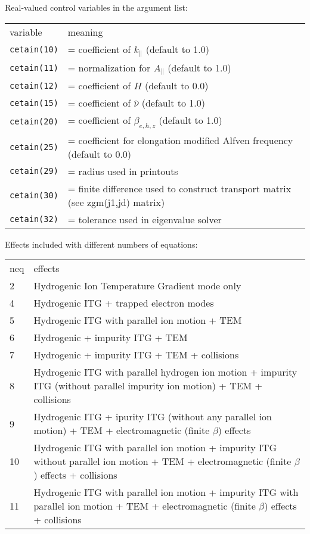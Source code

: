 \renewcommand{\arraystretch}{1.0}
\begin{center}
Real-valued control variables in the argument list:
\begin{tabular}{lp{4.0in}}
variable & meaning \\
{\tt cetain(10)} & = coefficient of $ k_\parallel $ (default to 1.0) \\
{\tt cetain(11)} & = normalization for $ A_\parallel $ (default to 1.0) \\
{\tt cetain(12)} & = coefficient of $H$ (default to 0.0) \\
{\tt cetain(15)} & = coefficient of $ \hat{\nu} $ (default to 1.0) \\
{\tt cetain(20)} & = coefficient of $ \beta_{e,h,z} $ (default to 1.0) \\
{\tt cetain(25)} & = coefficient for elongation modified Alfven frequency (default to 0.0) \\
{\tt cetain(29)} & = radius used in printouts \\
{\tt cetain(30)} & = finite difference used to construct
                   transport matrix (see zgm(j1,jd) matrix) \\
{\tt cetain(32)} & = tolerance used in eigenvalue solver \\

\end{tabular}
\end{center}

\renewcommand{\arraystretch}{1.0}
\begin{center}
Effects included with different numbers of equations:
\begin{tabular}{lp{5.0in}}
neq & effects \\
2 & Hydrogenic Ion Temperature Gradient mode only \\
4 & Hydrogenic ITG + trapped electron modes \\
5 & Hydrogenic ITG with parallel ion motion + TEM \\
6 & Hydrogenic + impurity ITG + TEM \\
7 & Hydrogenic + impurity ITG + TEM + collisions \\
8 & Hydrogenic ITG with parallel hydrogen ion motion  
  + impurity ITG (without parallel impurity ion motion)
  + TEM + collisions\\
9 & Hydrogenic ITG + ipurity ITG (without any parallel ion motion)
  + TEM + electromagnetic (finite $\beta$) effects \\
10 & Hydrogenic ITG with parallel ion motion
  + impurity ITG without parallel ion motion
  + TEM + electromagnetic (finite $\beta$) effects + collisions \\
11 & Hydrogenic ITG with parallel ion motion
  + impurity ITG with parallel ion motion
  + TEM + electromagnetic (finite $\beta$) effects + collisions \\

\end{tabular}
\end{center}


